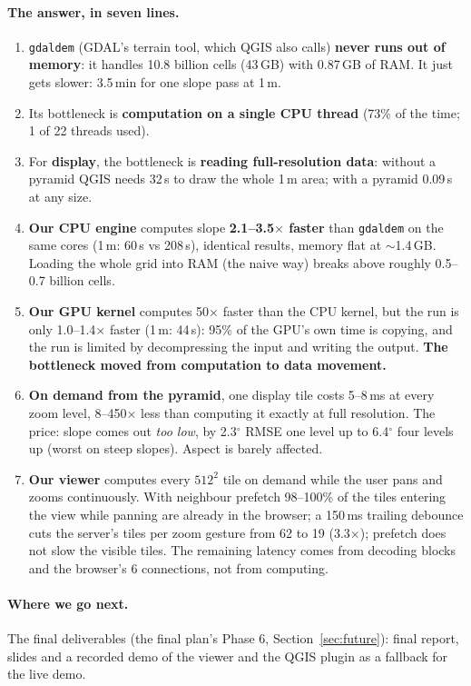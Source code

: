 ﻿\documentclass[11pt,a4paper]{article}
\newcommand{\code}[1]{\texttt{#1}}
\begin{document}
\paragraph{The answer, in seven lines.}
\begin{enumerate}
  \item \code{gdaldem} (GDAL's terrain tool, which QGIS also calls) \textbf{never runs out of memory}: it handles
  10.8 billion cells (43\,GB) with 0.87\,GB of RAM. It just gets slower: 3.5\,min for one slope pass at 1\,m.
  \item Its bottleneck is \textbf{computation on a single CPU thread} (73\% of the time; 1 of 22 threads used).
  \item For \textbf{display}, the bottleneck is \textbf{reading full-resolution data}: without a pyramid QGIS needs
  32\,s to draw the whole 1\,m area; with a pyramid 0.09\,s at any size.
  \item \textbf{Our CPU engine} computes slope \textbf{2.1--3.5$\times$ faster} than \code{gdaldem} on the same cores
  (1\,m: 60\,s vs 208\,s), identical results, memory flat at $\sim$1.4\,GB. Loading the whole grid into RAM (the naive
  way) breaks above roughly 0.5--0.7 billion cells.
  \item \textbf{Our GPU kernel} computes 50$\times$ faster than the CPU kernel, but the run is only 1.0--1.4$\times$
  faster (1\,m: 44\,s): 95\% of the GPU's own time is copying, and the run is limited by decompressing the input and
  writing the output. \textbf{The bottleneck moved from computation to data movement.}
  \item \textbf{On demand from the pyramid}, one display tile costs 5--8\,ms at every zoom level, 8--450$\times$ less
  than computing it exactly at full resolution. The price: slope comes out \emph{too low}, by 2.3$^\circ$ RMSE one
  level up to 6.4$^\circ$ four levels up (worst on steep slopes). Aspect is barely affected.
  \item \textbf{Our viewer} computes every $512^2$ tile on demand while the user pans and zooms continuously. With
  neighbour prefetch 98--100\% of the tiles entering the view while panning are already in the browser; a 150\,ms
  trailing debounce cuts the server's tiles per zoom gesture from 62 to 19 (3.3$\times$); prefetch does not slow the
  visible tiles. The remaining latency comes from decoding blocks and the browser's 6 connections, not from computing.
\end{enumerate}

\paragraph{Where we go next.} The final deliverables (the final plan's Phase 6, Section~\ref{sec:future}): final
report, slides and a recorded demo of the viewer and the QGIS plugin as a fallback for the live demo.
\end{document}
